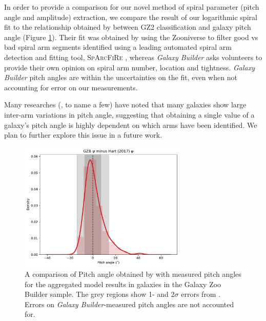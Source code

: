 \documentclass[../main.tex]{subfiles}
\begin{document}
In order to provide a comparison for our novel method of spiral parameter (pitch angle and amplitude) extraction, we compare the result of our logarithmic spiral fit to the relationship obtained by \citet{Hart2016:1607.01019v1} between GZ2 classification and galaxy pitch angle (Figure \ref{fig:hart_pitch_angle}). Their fit was obtained by using the Zooniverse to filter good vs bad spiral arm segments identified using a leading automated spiral arm detection and fitting tool, \textsc{SpArcFiRe} \citep{Davis2014:1402.1910v1}, whereas \textit{Galaxy Builder} asks volunteers to provide their own opinion on spiral arm number, location and tightness. \textit{Galaxy Builder} pitch angles are within the uncertainties on the \citet{Hart2016:1607.01019v1} fit, even when not accounting for error on our measurements.

Many researches (\citealt{Davis2014:1402.1910v1}, \citealt{2019arXiv190804246D} to name a few) have noted that many galaxies show large inter-arm variations in pitch angle, suggesting that obtaining a single value of a galaxy's pitch angle is highly dependent on which arms have been identified. We plan to further explore this issue in a future work.

\begin{figure}
  \includegraphics[width=8cm]{images__results/gzb-hart-comparison.pdf}
  \caption{A comparison of Pitch angle obtained by \citet{Hart2016:1607.01019v1} with measured pitch angles for the aggregated model results in galaxies in the Galaxy Zoo Builder sample. The grey regions show 1- and $2\sigma$ errors from \citet{Hart2016:1607.01019v1}. Errors on \textit{Galaxy Builder}-measured pitch angles are not accounted for.}
  \label{fig:hart_pitch_angle}
\end{figure}
\end{document}
